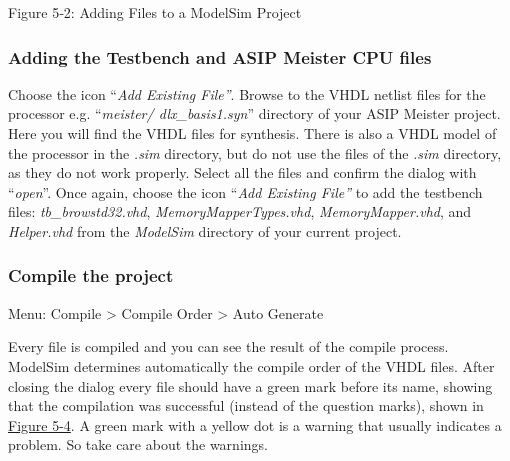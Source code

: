 \documentclass[
]{article}
\begin{document}
Figure 5‑2\protect\hypertarget{Fig52}{}{}: Adding Files to a ModelSim
Project

\hypertarget{adding-the-testbench-and-asip-meister-cpu-files}{%
\subsubsection{Adding the Testbench and ASIP Meister CPU
files}\label{adding-the-testbench-and-asip-meister-cpu-files}}

Choose the icon ``\emph{Add Existing File''}. Browse to the VHDL netlist
files for the processor e.g. ``\emph{meister/ dlx\_basis1.syn}''
directory of your ASIP Meister project. Here you will find the VHDL
files for synthesis. There is also a VHDL model of the processor in the
\emph{.sim} directory, but do {not} use the files of the \emph{.sim}
directory, as they do not work properly. Select all the files and
confirm the dialog with ``\emph{open}''. Once again, choose the icon
``\emph{Add Existing File''} to add the testbench files:
\emph{tb\_browstd32.vhd}, \emph{MemoryMapperTypes.vhd},
\emph{MemoryMapper.vhd}, and \emph{Helper.vhd} from the \emph{ModelSim}
directory of your current project.

\hypertarget{compile-the-project}{%
\subsubsection{Compile the project}\label{compile-the-project}}

Menu: Compile \textgreater{} Compile Order \textgreater{} Auto Generate

Every file is compiled and you can see the result of the compile
process. ModelSim determines automatically the compile order of the VHDL
files. After closing the dialog every file should have a green mark
before its name, showing that the compilation was successful (instead of
the question marks), shown in \protect\hyperlink{Fig54}{Figure 5-4}. A
green mark with a yellow dot is a warning that usually indicates a
problem. So take care about the warnings.
\end{document}
